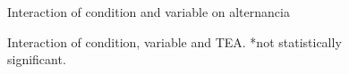 \documentclass{article}
\begin{document}
\begin{figure}[H]
  \caption{Interaction of condition and variable on alternancia}
  \noindent{}
  \centering
\end{figure}

\begin{figure}[H]
  \caption{Interaction of condition, variable and TEA. *not statistically significant.}
  \noindent{}
  \centering
\end{figure}
\end{document}
